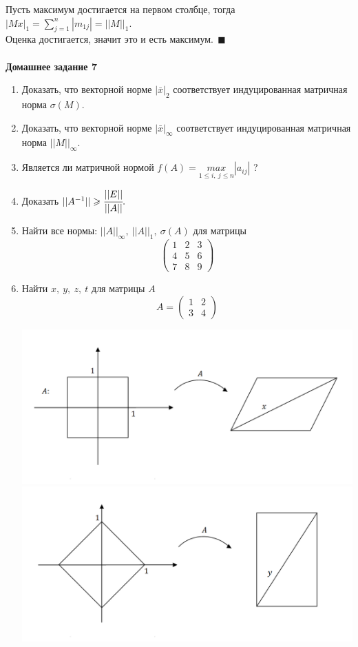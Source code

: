\documentclass[12pt]{article}
\theoremstyle{definition}
\numberwithin{equation}{section}
\begin{document}
	Пусть максимум достигается на первом столбце, тогда $|Mx|_1=\sum\limits_{j=1}^n|m_{1j}|=||M||_1$.\\
	Оценка достигается, значит это и есть максимум.$~~\blacksquare$\\ \\
	\textbf{Домашнее задание 7}\begin{enumerate}
		\item Доказать, что векторной норме $|\bar x|_2$ соответствует индуцированная матричная норма $\sigma(M)$.
		\item Доказать, что векторной норме $|\bar x|_{\infty}$ соответствует индуцированная матричная норма $||M||_{\infty}$.
		\item Является ли матричной нормой $f(A)=\underset{1\leqslant i,~j\leqslant n}{max}|a_{ij}|$ ?
		\item Доказать $||A^{-1}||\geqslant\cfrac{||E||}{||A||}.$
		\item Найти все нормы: $||A||_{\infty}, ~||A||_1, ~\sigma(A)$ для матрицы \[\begin{pmatrix}
		1 & 2 & 3\\
		4 & 5 & 6\\
		7 & 8 & 9
		\end{pmatrix}\]
		\item Найти $x,~y,~z,~t$ для матрицы $A$ \[A=\begin{pmatrix}
		1 & 2\\
		3 & 4
		\end{pmatrix}\]
		\begin{center}
			\includegraphics[scale=0.6]{l7_2.png}\\
			\includegraphics[scale=0.6]{l7_3.png}\\

\end{center}
\end{enumerate}
\end{document}
